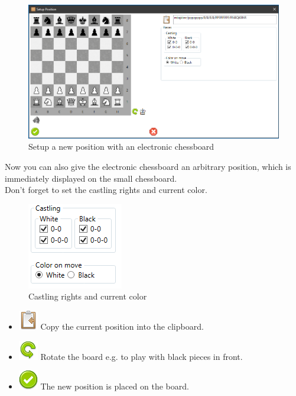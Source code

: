 \documentclass[11pt,a4paper]{article}
\begin{document}
\begin{figure}[H]
	\centering
	\includegraphics[scale=0.5]{SetupPosition4.png}
	\caption{Setup a new position with an electronic chessboard}
	\label{fig:SetupPosition4}
\end{figure}

Now you can also give the electronic chessboard an arbitrary position, which is immediately displayed on the small chessboard.\\
Don't forget to set the castling rights and current color.

\begin{figure}[H]
	\centering
	\includegraphics[scale=1.0]{castling.png}
	\caption{Castling rights and current color}
	\label{fig:castling2}
\end{figure}

\begin{itemize}
	\item \includegraphics[scale=0.5]{clipboard_sign_out.png} Copy the current position into the clipboard.
	\item \includegraphics[scale=0.5]{arrow_rotate_anticlockwise.png} Rotate the board e.g. to play with black pieces in front.
	\item \includegraphics[scale=0.5]{accept_button.png} The new position is placed on the board.
\end{itemize}
\end{document}

